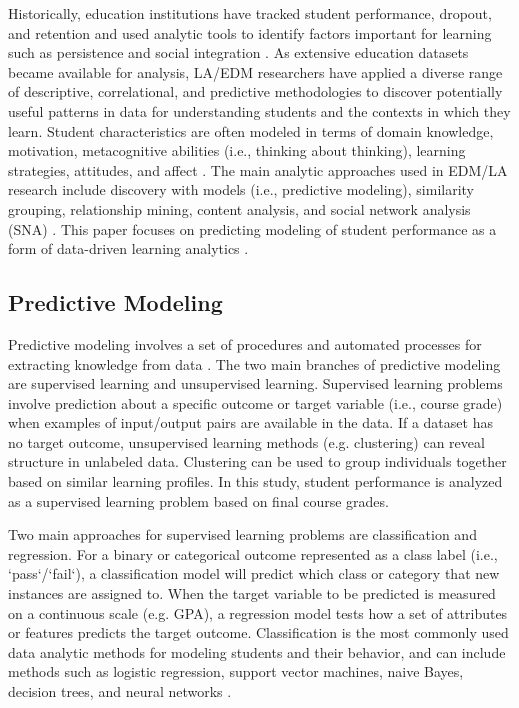 \documentclass[sigconf]{acmart}
\begin{document}
Historically, education institutions have tracked student performance, 
dropout, and retention and used analytic tools to identify factors important 
for learning such as persistence and social integration \cite{ferguson12}. 
As extensive education datasets became available for analysis, LA/EDM 
researchers have applied a diverse range of descriptive, correlational, and 
predictive methodologies to discover potentially useful patterns in data for 
understanding students and the contexts in which they learn. Student 
characteristics are often modeled in terms of domain knowledge, motivation, 
metacognitive abilities (i.e., thinking about thinking), learning strategies, 
attitudes, and affect \cite{papamitsiou14}. The main analytic approaches used 
in EDM/LA research include discovery with models (i.e., predictive modeling), 
similarity grouping, relationship mining, content analysis, and social network 
analysis (SNA) \cite{baker09}. This paper focuses on predicting modeling of
student performance as a form of data-driven learning analytics
\cite{verbert12}. 


\subsection{Predictive Modeling}

Predictive modeling involves a set of procedures and automated processes for 
extracting knowledge from data \cite{jamesetal13, kuhn13}. The two main 
branches of predictive modeling are supervised learning and unsupervised 
learning. Supervised learning problems involve prediction about a specific 
outcome or target variable (i.e., course grade) when examples of input/output 
pairs are available in the data. If a dataset has no target outcome, 
unsupervised learning methods (e.g. clustering) can reveal structure in 
unlabeled data. Clustering can be used to group individuals together based 
on similar learning profiles. In this study, student performance is analyzed
as a supervised learning problem based on final course grades. 


Two main approaches for supervised learning problems are classification and 
regression. For a binary or categorical outcome represented as a class label 
(i.e., `pass`/`fail`), a classification model will predict which class or 
category that new instances are assigned to. When the target variable to be 
predicted is measured on a continuous scale (e.g. GPA), a regression model 
tests how a set of attributes or features predicts the target outcome. 
Classification is the most commonly used data analytic methods for modeling 
students and their behavior, and can include methods such as logistic 
regression, support vector machines, naive Bayes, decision trees, and 
neural networks \cite{Lykourentzou09, pariyadath14, zhang05}. 
\end{document}
